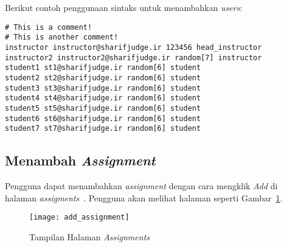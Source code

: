 Berikut contoh penggunaan sintaks untuk menambahkan \textit{users}:
\begin{lstlisting}[basicstyle=\ttfamily, frame=single,
columns=fullflexible, keepspaces=true, breaklines=true]
# This is a comment!
# This is another comment!
instructor instructor@sharifjudge.ir 123456 head_instructor
instructor2 instructor2@sharifjudge.ir random[7] instructor
student1 st1@sharifjudge.ir random[6] student
student2 st2@sharifjudge.ir random[6] student
student3 st3@sharifjudge.ir random[6] student
student4 st4@sharifjudge.ir random[6] student
student5 st5@sharifjudge.ir random[6] student
student6 st6@sharifjudge.ir random[6] student
student7 st7@sharifjudge.ir random[6] student
\end{lstlisting}

\subsection{Menambah \textit{Assignment}}
Pengguna dapat menambahkan \textit{assignment} dengan cara mengklik \textit{Add} di halaman \textit{assigments}~\cite{mjnaderi:14:sharifjudgedoc}. Pengguna akan melihat halaman seperti Gambar~\ref{fig:addass}.
\begin{figure}[H]
	\centering  
	\texttt{[image: add\_assignment]}  
	\caption[Tampilan Halaman \textit{Assignments}]{Tampilan Halaman \textit{Assignments}} 
	\label{fig:addass} 
\end{figure} 


